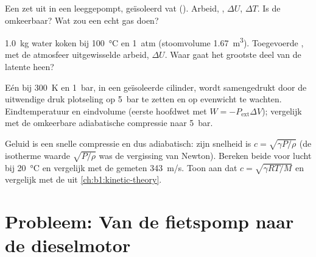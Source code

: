 \begin{exercise}[$\star\star$]\label{exo:b1:first-law:9}
Een  zet uit in een leeggepompt, geïsoleerd vat (). Arbeid, , $\Delta U$, $\Delta T$. Is de 
omkeerbaar? Wat zou een echt gas doen?
\end{exercise}

\begin{exercise}[$\star\star\star$]\label{exo:b1:first-law:10}
\qty{1.0}{kg} water koken bij \qty{100}{\degreeCelsius} en \qty{1}{atm}
(stoomvolume \qty{1.67}{m^3}). Toegevoerde , met de atmosfeer uitgewisselde
arbeid, $\Delta U$. Waar gaat het grootste deel van de latente  heen?
\end{exercise}

\begin{exercise}[$\star\star\star$]\label{exo:b1:first-law:11}
Eén   bij \qty{300}{K} en \qty{1}{bar}, in een geïsoleerde
cilinder, wordt samengedrukt door de uitwendige druk plotseling op
\qty{5}{bar} te zetten en op evenwicht te wachten. Eindtemperatuur en eindvolume
(eerste hoofdwet met $W = -P_{\mathrm{ext}}\Delta V$); vergelijk met de omkeerbare
adiabatische compressie naar \qty{5}{bar}.
\end{exercise}

\begin{exercise}[$\star\star\star$]\label{exo:b1:first-law:12}
Geluid is een snelle compressie en dus adiabatisch: zijn snelheid is $c = \sqrt{\gamma P/\rho}$
(de isotherme waarde $\sqrt{P/\rho}$ was de vergissing van Newton). Bereken beide
voor lucht bij \qty{20}{\degreeCelsius} en vergelijk met de gemeten
\qty{343}{m/s}. Toon aan dat $c = \sqrt{\gamma RT/M}$ en vergelijk met de  uit \cref{ch:b1:kinetic-theory}.
\end{exercise}

\section{Probleem: Van de fietspomp naar de dieselmotor}

